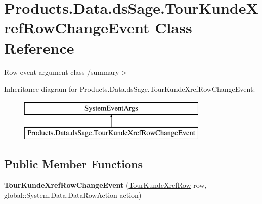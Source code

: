 \hypertarget{class_products_1_1_data_1_1ds_sage_1_1_tour_kunde_xref_row_change_event}{}\section{Products.\+Data.\+ds\+Sage.\+Tour\+Kunde\+Xref\+Row\+Change\+Event Class Reference}
\label{class_products_1_1_data_1_1ds_sage_1_1_tour_kunde_xref_row_change_event}


Row event argument class /summary$>$  


Inheritance diagram for Products.\+Data.\+ds\+Sage.\+Tour\+Kunde\+Xref\+Row\+Change\+Event\+:\begin{figure}[H]
\begin{center}
\leavevmode
\includegraphics[height=2.000000cm]{class_products_1_1_data_1_1ds_sage_1_1_tour_kunde_xref_row_change_event}
\end{center}
\end{figure}
\subsection*{Public Member Functions}
\begin{DoxyCompactItemize}
\item 
{\bfseries Tour\+Kunde\+Xref\+Row\+Change\+Event} (\hyperlink{class_products_1_1_data_1_1ds_sage_1_1_tour_kunde_xref_row}{Tour\+Kunde\+Xref\+Row} row, global\+::\+System.\+Data.\+Data\+Row\+Action action)\hypertarget{class_products_1_1_data_1_1ds_sage_1_1_tour_kunde_xref_row_change_event_ac99bd36f8df186dfe73fccd88c4896fe}{}\label{class_products_1_1_data_1_1ds_sage_1_1_tour_kunde_xref_row_change_event_ac99bd36f8df186dfe73fccd88c4896fe}

\end{DoxyCompactItemize}

